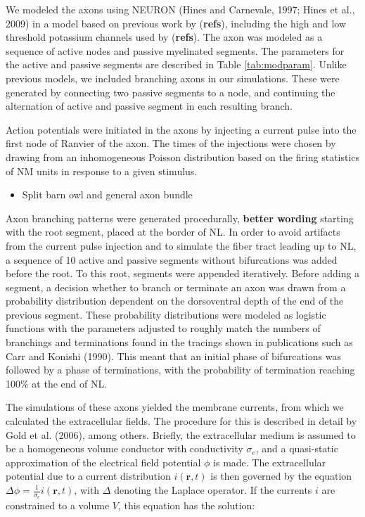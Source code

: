 \documentclass[]{article}
\begin{document}
We modeled the axons using NEURON (Hines and Carnevale, 1997; Hines et
al., 2009) in a model based on previous work by (\textbf{refs}),
including the high and low threshold potassium channels used by
(\textbf{refs}). The axon was modeled as a sequence of active nodes and
passive myelinated segments. The parameters for the active and passive
segments are described in Table \ref{tab:modparam}. Unlike previous
models, we included branching axons in our simulations. These were
generated by connecting two passive segments to a node, and continuing
the alternation of active and passive segment in each resulting branch.

Action potentials were initiated in the axons by injecting a current
pulse into the first node of Ranvier of the axon. The times of the
injections were chosen by drawing from an inhomogeneous Poisson
distribution based on the firing statistics of NM units in response to a
given stimulus.

\begin{itemize}
\itemsep1pt\parskip0pt
\item
  Split barn owl and general axon bundle
\end{itemize}

Axon branching patterns were generated procedurally, \textbf{better
wording} starting with the root segment, placed at the border of NL. In
order to avoid artifacts from the current pulse injection and to
simulate the fiber tract leading up to NL, a sequence of 10 active and
passive segments without bifurcations was added before the root. To this
root, segments were appended iteratively. Before adding a segment, a
decision whether to branch or terminate an axon was drawn from a
probability distribution dependent on the dorsoventral depth of the end
of the previous segment. These probability distributions were modeled as
logistic functions with the parameters adjusted to roughly match the
numbers of branchings and terminations found in the tracings shown in
publications such as Carr and Konishi (1990). This meant that an initial
phase of bifurcations was followed by a phase of terminations, with the
probability of termination reaching 100\% at the end of NL.

The simulations of these axons yielded the membrane currents, from which
we calculated the extracellular fields. The procedure for this is
described in detail by Gold et al. (2006), among others. Briefly, the
extracellular medium is assumed to be a homogeneous volume conductor
with conductivity \(\sigma_e\), and a quasi-static approximation of the
electrical field potential \(\phi\) is made. The extracellular potential
due to a current distribution \(i(\mathbf{r},t)\) is then governed by
the equation \(\Delta \phi = \frac{1}{\sigma_e} i(\mathbf{r},t)\), with
\(\Delta\) denoting the Laplace operator. If the currents \(i\) are
constrained to a volume \(V\), this equation has the solution:
\end{document}
